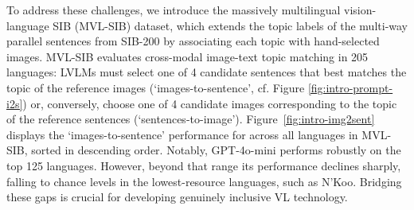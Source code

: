To address these challenges, we introduce the massively multilingual vision-language SIB (MVL-SIB) dataset, which extends the topic labels of the multi-way parallel sentences from SIB-200 \cite{adelani-etal-2024-sib} by associating each topic with hand-selected images. MVL-SIB evaluates cross-modal image-text topic matching in 205 languages: LVLMs must select one of 4 candidate sentences that best matches the topic of the reference images (`images-to-sentence', cf. Figure \ref{fig:intro-prompt-i2s}) or, conversely, choose one of 4 candidate images corresponding to the topic of the reference sentences (`sentences-to-image'). Figure~\ref{fig:intro-img2sent} displays the `images-to-sentence' performance for across all languages in MVL-SIB, sorted in descending order.
Notably, GPT-4o-mini performs robustly on the top 125 languages. However, beyond that range its performance declines sharply, falling to chance levels in the lowest-resource languages, such as N'Koo. %
Bridging these gaps is crucial for developing genuinely inclusive VL technology.




